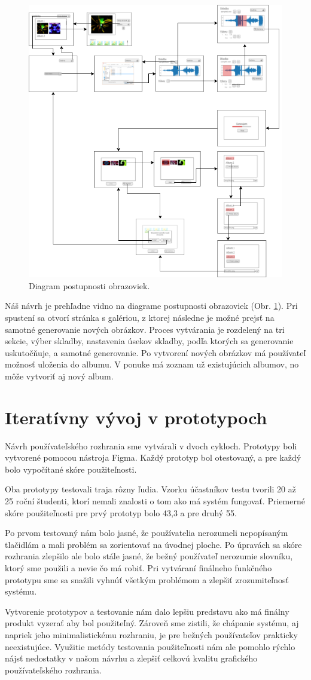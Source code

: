 \begin{figure}[!ht] 
	\centering 
	\includegraphics[height=.5\textwidth]{figures/ssq} 
	\caption{Diagram postupnosti obrazoviek.} 
	\label{ssq}
\end{figure}

Náš návrh je prehľadne vidno na diagrame postupnosti obrazoviek (Obr. \ref{ssq}).
Pri spustení sa otvorí stránka s galériou, z ktorej následne je možné prejsť na samotné generovanie nových obrázkov.
Proces vytvárania je rozdelený na tri sekcie, výber skladby, nastavenia úsekov skladby, podľa ktorých sa generovanie uskutočňuje, a samotné generovanie.
Po vytvorení nových obrázkov má používateľ možnosť uloženia do albumu.
V ponuke má zoznam už existujúcich albumov, no môže vytvoriť aj nový album.

\section{Iteratívny vývoj v prototypoch}
Návrh používateľského rozhrania sme vytvárali v dvoch cykloch.
Prototypy boli vytvorené pomocou nástroja Figma.
Každý prototyp bol otestovaný, a pre každý bolo vypočítané skóre použiteľnosti.

Oba prototypy testovali traja rôzny ľudia.
Vzorku účastníkov testu tvorili 20 až 25 roční študenti, ktorí nemali znalosti o tom ako má systém fungovať.
Priemerné skóre použiteľnosti pre prvý prototyp bolo 43,3 a pre druhý 55.

Po prvom testovaný nám bolo jasné, že používatelia nerozumeli nepopísaným tlačidlám a mali problém sa zorientovať na úvodnej ploche.
Po úpravách sa skóre rozhrania zlepšilo ale bolo stále jasné, že bežný používateľ nerozumie slovníku, ktorý sme použili a nevie čo má robiť.
Pri vytváraní finálneho funkčného prototypu sme sa snažili vyhnúť všetkým problémom a zlepšiť zrozumiteľnosť systému.


Vytvorenie prototypov a testovanie nám dalo lepšiu predstavu ako má finálny produkt vyzerať aby bol použiteľný.
Zároveň sme zistili, že chápanie systému, aj napriek jeho minimalistickému rozhraniu, je pre bežných používateľov prakticky neexistujúce.
Využitie metódy testovania použiteľnosti nám ale pomohlo rýchlo nájsť nedostatky v našom návrhu a zlepšiť celkovú kvalitu grafického používateľského rozhrania.
